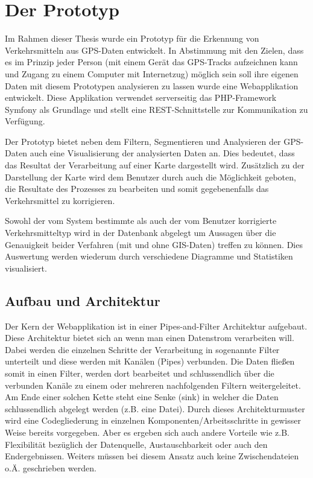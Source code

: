 \chapter{Der Prototyp}

Im Rahmen dieser Thesis  wurde ein Prototyp für die Erkennung von Verkehrsmitteln aus GPS-Daten entwickelt. In Abstimmung mit den Zielen, dass es im Prinzip jeder Person (mit einem Gerät das GPS-Tracks aufzeichnen kann und Zugang zu einem Computer mit Internetzug) möglich sein soll ihre eigenen Daten mit diesem Prototypen analysieren zu lassen wurde eine Webapplikation entwickelt. Diese Applikation verwendet serverseitig das PHP-Framework Symfony als Grundlage und stellt eine REST-Schnittstelle zur Kommunikation zu Verfügung.

Der Prototyp bietet neben dem Filtern, Segmentieren und Analysieren der GPS-Daten auch eine Visualisierung der analysierten Daten an. Dies bedeutet, dass das Resultat der Verarbeitung auf einer Karte dargestellt wird. Zusätzlich zu der Darstellung der Karte wird dem Benutzer durch auch die Möglichkeit geboten, die Resultate des Prozesses zu bearbeiten und somit gegebenenfalls das Verkehrsmittel zu korrigieren. 

Sowohl der vom System bestimmte als auch der vom Benutzer  korrigierte Verkehrsmitteltyp wird in der Datenbank abgelegt um Aussagen über die Genauigkeit beider Verfahren (mit und ohne GIS-Daten) treffen zu können. Dies Auswertung werden wiederum durch verschiedene Diagramme und Statistiken visualisiert.
\clearpage

\section{Aufbau und Architektur}
Der Kern der Webapplikation ist in einer Pipes-and-Filter Architektur aufgebaut. Diese Architektur bietet sich an wenn man einen Datenstrom verarbeiten will. Dabei werden die einzelnen Schritte der Verarbeitung in sogenannte Filter unterteilt und diese werden mit Kanälen (Pipes) verbunden. Die Daten fließen somit in einen Filter, werden dort bearbeitet und schlussendlich über die verbunden Kanäle zu einem oder mehreren nachfolgenden Filtern weitergeleitet. Am Ende einer solchen Kette steht eine Senke (sink) in welcher die Daten schlussendlich abgelegt werden (z.B. eine Datei). Durch dieses Architekturmuster wird eine Codegliederung in einzelnen Komponenten/Arbeitsschritte in gewisser Weise bereits vorgegeben. Aber es ergeben sich auch andere Vorteile wie z.B. Flexibilität bezüglich der Datenquelle, Austauschbarkeit oder auch den Endergebnissen. Weiters müssen bei diesem Ansatz auch keine Zwischendateien o.Ä. geschrieben werden. \cite{buschmann_pipes_1998} 

